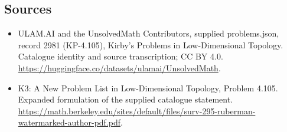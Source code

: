 \documentclass[11pt,a4paper]{article}
\begin{document}
\subsection{Sources}
\begin{itemize}
\item[S1] ULAM.AI and the UnsolvedMath Contributors, supplied problems.json, record 2981 (KP-4.105), Kirby's Problems in Low-Dimensional Topology. Catalogue identity and source transcription; CC BY 4.0.
\url{https://huggingface.co/datasets/ulamai/UnsolvedMath}.
\item[S2] K3: A New Problem List in Low-Dimensional Topology, Problem 4.105. Expanded formulation of the supplied catalogue statement.
\url{https://math.berkeley.edu/sites/default/files/surv-295-ruberman-watermarked-author-pdf.pdf}.
\end{itemize}
\end{document}
